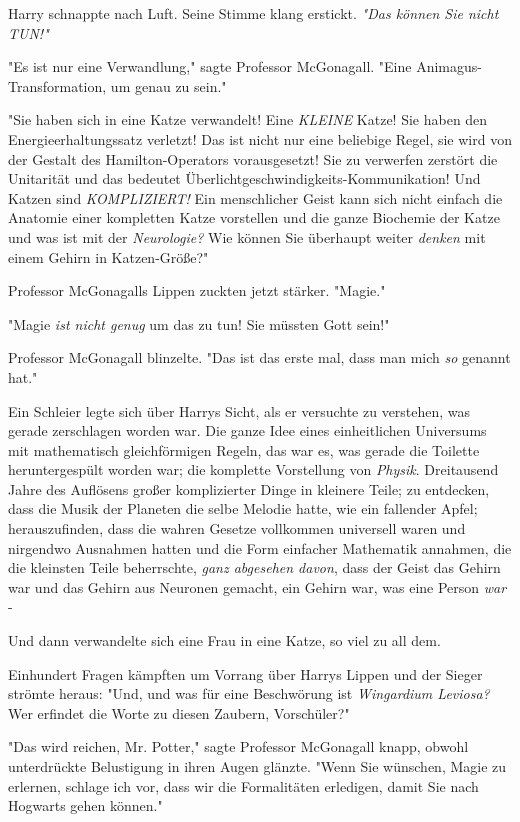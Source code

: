 {Harry schnappte nach Luft. Seine Stimme klang erstickt. \emph{"Das können Sie nicht TUN!"}

"Es ist nur eine Verwandlung," sagte Professor McGonagall. "Eine Animagus-Transformation, um genau zu sein."

"Sie haben sich in eine Katze verwandelt! Eine \emph{KLEINE} Katze! Sie haben den Energieerhaltungssatz verletzt! Das ist nicht nur eine beliebige Regel, sie wird von der Gestalt des Hamilton-Operators vorausgesetzt! Sie zu verwerfen zerstört die Unitarität und das bedeutet Überlichtgeschwindigkeits-Kommunikation! Und Katzen sind \emph{KOMPLIZIERT!} Ein menschlicher Geist kann sich nicht einfach die Anatomie einer kompletten Katze vorstellen und die ganze Biochemie der Katze und was ist mit der \emph{Neurologie?} Wie können Sie überhaupt weiter \emph{denken} mit einem Gehirn in Katzen-Größe?"

Professor McGonagalls Lippen zuckten jetzt stärker. "Magie."

"Magie \emph{ist nicht genug} um das zu tun! Sie müssten Gott sein!"

Professor McGonagall blinzelte. "Das ist das erste mal, dass man mich \emph{so} genannt hat."

Ein Schleier legte sich über Harrys Sicht, als er versuchte zu verstehen, was gerade zerschlagen worden war. Die ganze Idee eines einheitlichen Universums mit mathematisch gleichförmigen Regeln, das war es, was gerade die Toilette heruntergespült worden war; die komplette Vorstellung von \emph{Physik}. Dreitausend Jahre des Auflösens großer komplizierter Dinge in kleinere Teile; zu entdecken, dass die Musik der Planeten die selbe Melodie hatte, wie ein fallender Apfel; herauszufinden, dass die wahren Gesetze vollkommen universell waren und nirgendwo Ausnahmen hatten und die Form einfacher Mathematik annahmen, die die kleinsten Teile beherrschte, \emph{ganz abgesehen davon}, dass der Geist das Gehirn war und das Gehirn aus Neuronen gemacht, ein Gehirn war, was eine Person \emph{war} -

Und dann verwandelte sich eine Frau in eine Katze, so viel zu all dem.

Einhundert Fragen kämpften um Vorrang über Harrys Lippen und der Sieger strömte heraus: "Und, und was für eine Beschwörung ist \emph{Wingardium Leviosa?} Wer erfindet die Worte zu diesen Zaubern, Vorschüler?"

"Das wird reichen, Mr. Potter," sagte Professor McGonagall knapp, obwohl unterdrückte Belustigung in ihren Augen glänzte. "Wenn Sie wünschen, Magie zu erlernen, schlage ich vor, dass wir die Formalitäten erledigen, damit Sie nach Hogwarts gehen können."

}
